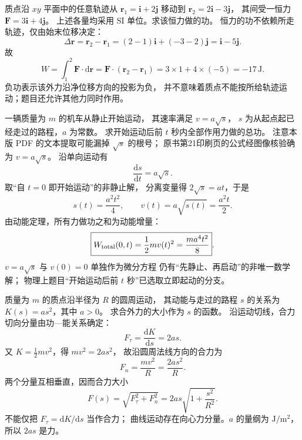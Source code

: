 质点沿 $xy$ 平面中的任意轨迹从
$\bm r_1=\bm i+2\bm j$ 移动到
$\bm r_2=2\bm i-3\bm j$，
其间受一恒力 $\bm F=3\bm i+4\bm j$。
上述各量均采用 SI 单位。求该恒力做的功。
\exsolution
恒力的功不依赖所走轨迹，仅由始末位移决定：
\[
\Delta\bm r=\bm r_2-\bm r_1
=(2-1)\bm i+(-3-2)\bm j
=\bm i-5\bm j.
\]
故
\[
\boxed{W=\int_1^2\bm F\cdot\mathrm d\bm r
=\bm F\cdot(\bm r_2-\bm r_1)
=3\times1+4\times(-5)=-17\,\mathrm J}.
\]
\excheck 负功表示该外力沿净位移方向的投影为负，
并不意味着质点不能按所给轨迹运动；题目还允许其他力同时作用。

一辆质量为 $m$ 的机车从静止开始运动，
其速率满足 $v=a\sqrt s$，
$s$ 为从起点起已经走过的路程，$a$ 为常数。
求开始运动后前 $t$ 秒内全部作用力做的总功。
\exsolution
注意本版 PDF 的文本提取可能漏掉 $\sqrt s$ 的根号；
原书第21印刷页的公式经图像核验确为 $v=a\sqrt s$。
沿单向运动有
\[
\frac{\mathrm ds}{\mathrm dt}=a\sqrt s.
\]
取“自 $t=0$ 即开始运动”的非静止解，
分离变量得
$2\sqrt s=at$，于是
\[
s(t)=\frac{a^2t^2}{4},\qquad
v(t)=a\sqrt{s(t)}=\frac{a^2t}{2}.
\]
由动能定理，所有力做功之和为动能增量：
\[
\boxed{W_{\rm total}(0,t)=\frac12mv(t)^2
=\frac{ma^4t^2}{8}}.
\]
\excheck $v=a\sqrt{s}$ 与 $v(0)=0$ 单独作为微分方程
仍有“先静止、再启动”的非唯一数学解；
物理上题目“开始运动后前 $t$ 秒”已选取立即起动的分支。

质量为 $m$ 的质点沿半径为 $R$ 的圆周运动，
其动能与走过的路程 $s$ 的关系为
$K(s)=as^2$，其中 $a>0$。
求合外力的大小作为 $s$ 的函数。
\exsolution
沿运动切线，合力切向分量由功—能关系确定：
\[
F_\tau=\frac{\mathrm dK}{\mathrm ds}=2as.
\]
又 $K=\frac12mv^2$，得 $mv^2=2as^2$，
故沿圆周法线方向的合力为
\[
F_n=\frac{mv^2}{R}=\frac{2as^2}{R}.
\]
两个分量互相垂直，因而合力大小
\[
\boxed{F(s)=\sqrt{F_\tau^2+F_n^2}
=2as\sqrt{1+\frac{s^2}{R^2}}}.
\]
\excheck 不能仅把 $F_\tau=\mathrm dK/\mathrm ds$ 当作合力；
曲线运动存在向心力分量。$a$ 的量纲为
$\mathrm{J/m^2}$，所以 $2as$ 是力。
